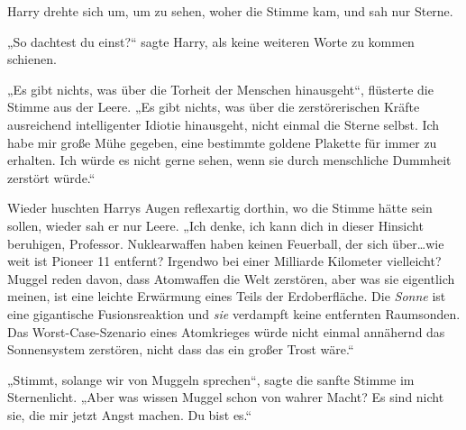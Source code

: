 Harry drehte sich um, um zu sehen, woher die Stimme kam, und sah nur Sterne.

„So dachtest du einst?“ sagte Harry, als keine weiteren Worte zu kommen schienen.

„Es gibt nichts, was über die Torheit der Menschen hinausgeht“, flüsterte die Stimme aus der Leere. „Es gibt nichts, was über die zerstörerischen Kräfte ausreichend intelligenter Idiotie hinausgeht, nicht einmal die Sterne selbst. Ich habe mir große Mühe gegeben, eine bestimmte goldene Plakette für immer zu erhalten. Ich würde es nicht gerne sehen, wenn sie durch menschliche Dummheit zerstört würde.“

Wieder huschten Harrys Augen reflexartig dorthin, wo die Stimme hätte sein sollen, wieder sah er nur Leere.
„Ich denke, ich kann dich in dieser Hinsicht beruhigen, Professor. Nuklearwaffen haben keinen Feuerball, der sich über…wie weit ist Pioneer 11 entfernt? Irgendwo bei einer Milliarde Kilometer vielleicht? Muggel reden davon, dass Atomwaffen die Welt zerstören, aber was sie eigentlich meinen, ist eine leichte Erwärmung eines Teils der Erdoberfläche. Die \emph{Sonne} ist eine gigantische Fusionsreaktion und \emph{sie} verdampft keine entfernten Raumsonden. Das Worst-Case-Szenario eines Atomkrieges würde nicht einmal annähernd das Sonnensystem zerstören, nicht dass das ein großer Trost wäre.“

„Stimmt, solange wir von Muggeln sprechen“, sagte die sanfte Stimme im Sternenlicht. „Aber was wissen Muggel schon von wahrer Macht? Es sind nicht sie, die mir jetzt Angst machen. Du bist es.“

